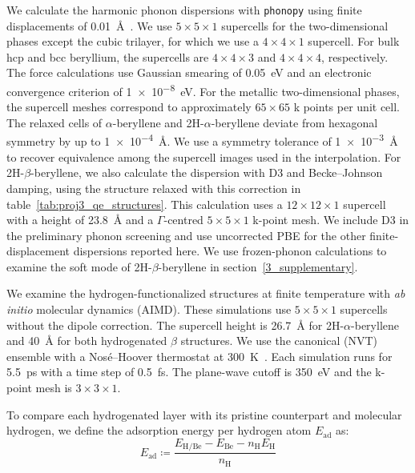 We calculate the harmonic phonon dispersions with \texttt{phonopy} using finite displacements of \qty{0.01}{\angstrom}~\cite{togo2015first,togo2023implementation}.
We use $5 \times 5 \times 1$ supercells for the two-dimensional phases except the cubic trilayer, for which we use a $4 \times 4 \times 1$ supercell.
For bulk hcp and bcc beryllium, the supercells are $4 \times 4 \times 3$ and $4 \times 4 \times 4$, respectively.
The force calculations use Gaussian smearing of \qty{0.05}{\electronvolt} and an electronic convergence criterion of \qty{1e-8}{\electronvolt}.
For the metallic two-dimensional phases, the supercell meshes correspond to approximately $65 \times 65$ k points per unit cell.
The relaxed cells of $\alpha$-beryllene and 2H-$\alpha$-beryllene deviate from hexagonal symmetry by up to \qty{1e-4}{\angstrom}.
We use a symmetry tolerance of \qty{1e-3}{\angstrom} to recover equivalence among the supercell images used in the interpolation.
For 2H-$\beta$-beryllene, we also calculate the dispersion with D3 and Becke--Johnson damping, using the structure relaxed with this correction in table~\ref{tab:proj3_qe_structures}.
This calculation uses a $12 \times 12 \times 1$ supercell with a height of \qty{23.8}{\angstrom} and a $\Gamma$-centred $5 \times 5 \times 1$ k-point mesh.
We include D3 in the preliminary phonon screening and use uncorrected PBE for the other finite-displacement dispersions reported here.
We use frozen-phonon calculations to examine the soft mode of 2H-$\beta$-beryllene in section~\ref{3_supplementary}.

We examine the hydrogen-functionalized structures at finite temperature with \textit{ab initio} molecular dynamics (AIMD).
These simulations use $5 \times 5 \times 1$ supercells without the dipole correction.
The supercell height is \qty{26.7}{\angstrom} for 2H-$\alpha$-beryllene and \qty{40}{\angstrom} for both hydrogenated $\beta$ structures.
We use the canonical (NVT) ensemble with a Nos\'e--Hoover thermostat at \qty{300}{\kelvin}~\cite{nose1984unified,hoover1985canonical}.
Each simulation runs for \qty{5.5}{\pico\second} with a time step of \qty{0.5}{\femto\second}.
The plane-wave cutoff is \qty{350}{\electronvolt} and the k-point mesh is $3 \times 3 \times 1$.

To compare each hydrogenated layer with its pristine counterpart and molecular hydrogen, we define the adsorption energy per hydrogen atom $E_{\mathrm{ad}}$ as:
\begin{equation}
    E_{\mathrm{ad}} \coloneqq
    \frac{E_{\mathrm{H/Be}}-E_{\mathrm{Be}}-n_{\mathrm{H}}E_{\mathrm{H}}}{n_{\mathrm{H}}}
\label{eq:proj3_hydrogen_adsorption_energy}
\end{equation}

